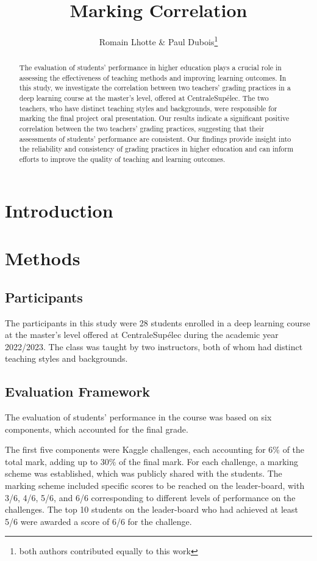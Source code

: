 \documentclass[a4paper]{article}
\title{Marking Correlation}
\author{Romain Lhotte \& Paul Dubois\footnote{both authors contributed equally to this work}}
\begin{document}
\maketitle

\begin{abstract}
	The evaluation of students' performance in higher education plays a crucial role in assessing the effectiveness of teaching methods and improving learning outcomes.
	In this study, we investigate the correlation between two teachers' grading practices in a deep learning course at the master's level, offered at CentraleSupélec.
	The two teachers, who have distinct teaching styles and backgrounds, were responsible for marking the final project oral presentation.
	Our results indicate a significant positive correlation between the two teachers' grading practices, suggesting that their assessments of students' performance are consistent.
	Our findings provide insight into the reliability and consistency of grading practices in higher education and can inform efforts to improve the quality of teaching and learning outcomes.
\end{abstract}

\section{Introduction}

\section{Methods}

\subsection{Participants}
The participants in this study were 28 students enrolled in a deep learning course at the master's level offered at CentraleSupélec during the academic year 2022/2023.
The class was taught by two instructors, both of whom had distinct teaching styles and backgrounds.

\subsection{Evaluation Framework}
The evaluation of students' performance in the course was based on six components, which accounted for the final grade.

The first five components were Kaggle challenges, each accounting for 6\% of the total mark, adding up to 30\% of the final mark.
For each challenge, a marking scheme was established, which was publicly shared with the students.
The marking scheme included specific scores to be reached on the leader-board, with 3/6, 4/6, 5/6, and 6/6 corresponding to different levels of performance on the challenges.
The top 10 students on the leader-board who had achieved at least 5/6 were awarded a score of 6/6 for the challenge.
\end{document}
